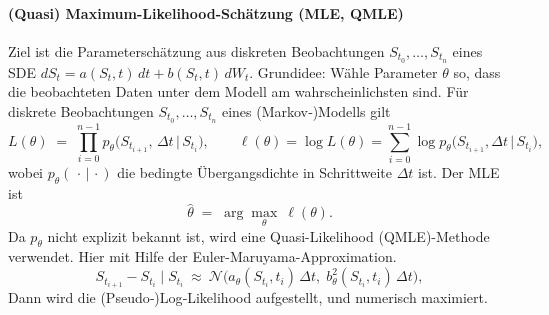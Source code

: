 \paragraph{(Quasi) Maximum-Likelihood-Schätzung (MLE, QMLE)}
Ziel ist die Parameterschätzung aus diskreten Beobachtungen $S_{t_0},\dots,S_{t_n}$ eines SDE
$dS_t=a(S_t,t)\,dt+b(S_t,t)\,dW_t$. Grundidee: Wähle Parameter $\theta$ so, dass die beobachteten Daten unter dem Modell am wahrscheinlichsten sind. Für diskrete Beobachtungen $S_{t_0},\dots,S_{t_n}$ eines (Markov‑)Modells gilt
$$
L(\theta) \;=\; \prod_{i=0}^{n-1} p_\theta\!\big(S_{t_{i+1}},\,\Delta t \,\big|\, S_{t_i}\big), 
\qquad
\ell(\theta)=\log L(\theta)=\sum_{i=0}^{n-1}\log p_\theta\!\big(S_{t_{i+1}},\Delta t \,\big|\, S_{t_i}\big),
$$
wobei $p_\theta(\,\cdot\,|\,\cdot)$ die bedingte Übergangsdichte in Schrittweite $\Delta t$ ist. Der MLE ist
$$
\widehat\theta\;=\;\arg\max_{\theta}\ \ell(\theta).
$$
Da $p_\theta$ nicht explizit bekannt ist, wird eine Quasi-Likelihood (QMLE)-Methode verwendet. Hier mit Hilfe der Euler-Maruyama-Approximation.
$$
S_{t_{i+1}}-S_{t_i}\mid S_{t_i}\ \approx\ \mathcal N\!\big(a_\theta(S_{t_i},t_i)\,\Delta t,\; b_\theta^2(S_{t_i},t_i)\,\Delta t\big),
$$
Dann wird die (Pseudo‑)Log‑Likelihood aufgestellt, und numerisch maximiert.


